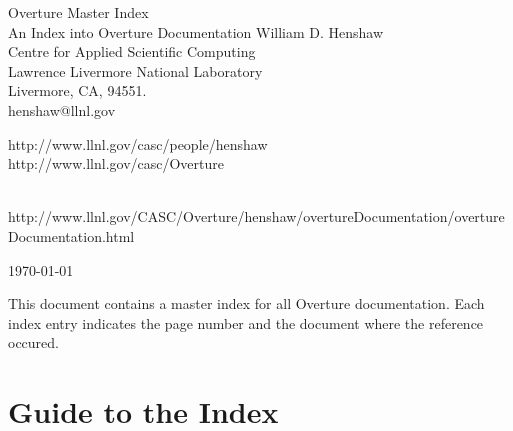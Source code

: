 \documentclass{article}
\newcommand{\Index}[1]{#1\index{#1}}
\begin{document}

\vspace{5\baselineskip}
\begin{flushleft}
{\Large
Overture Master Index \\
An Index into Overture Documentation
}
\vspace{2\baselineskip}
William D. Henshaw  \\
Centre for Applied Scientific Computing  \\
Lawrence Livermore National Laboratory      \\
Livermore, CA, 94551.  \\
henshaw@llnl.gov \\
\begin{latexonly}
http://www.llnl.gov/casc/people/henshaw \\
http://www.llnl.gov/casc/Overture \\
\end{latexonly}
\begin{htmlonly}
 \\
{http://www.llnl.gov/CASC/Overture/henshaw/overtureDocumentation/overtureDocumentation.html} \\
\end{htmlonly}
\vspace{\baselineskip}
\today
\vspace{\baselineskip}

\vspace{4\baselineskip}


This document contains a master \Index{index} for all Overture documentation. Each index entry
indicates the page number and the document where the reference occured.

\end{flushleft}

\vfill\eject
\section{Guide to the Index}

% 
\end{document}

